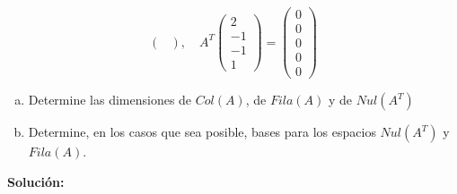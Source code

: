 \documentclass[12pt]{article}
\newenvironment{solucion}
{\begin{mdframed}[backgroundcolor=black!10]
		{\bf Solución:}\\
	}
	{
	\end{mdframed}
}
\newenvironment{preguntas}
{\begin{enumerate}\itemsep12pt
	}
	{
	\end{enumerate}
}
\begin{document}
\begin{preguntas}
$$\begin{pmatrix}
	\end{pmatrix}, \quad A^T \begin{pmatrix}
	2 \\ -1 \\ -1 \\ 1
	\end{pmatrix} = \begin{pmatrix}
	0 \\ 0 \\ 0 \\ 0 \\ 0
	\end{pmatrix}$$
\begin{enumerate}[a)]
\item Determine las dimensiones de $Col(A)$, de $Fila(A)$ y de $Nul(A^T)$
\item Determine, en los casos que sea posible, bases para los espacios $Nul(A^T)$ y $Fila(A)$.
\end{enumerate}
\begin{solucion}


\end{solucion}
\end{preguntas}
\end{document}
